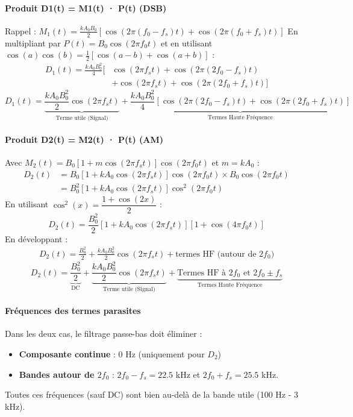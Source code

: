 \documentclass[11pt,a4paper]{article}
\begin{document}
\paragraph{Produit D1(t) = M1(t) · P(t) (DSB)}
Rappel : $M_1(t) = \frac{k A_0 B_0}{2}[\cos(2\pi(f_0-f_s)t) + \cos(2\pi(f_0+f_s)t)]$
En multipliant par $P(t) = B_0 \cos(2\pi f_0 t)$ et en utilisant $\cos(a)\cos(b) = \frac{1}{2}[\cos(a-b) + \cos(a+b)]$ :
\begin{align}
D_1(t) = \frac{k A_0 B_0^2}{4} [&\cos(2\pi f_s t) + \cos(2\pi(2f_0-f_s)t) \\
&+ \cos(2\pi f_s t) + \cos(2\pi(2f_0+f_s)t)]
\end{align}
\begin{equation}
\boxed{D_1(t) = \underbrace{\frac{k A_0 B_0^2}{2} \cos(2\pi f_s t)}_{\text{Terme utile (Signal)}} + \underbrace{\frac{k A_0 B_0^2}{4}[\cos(2\pi(2f_0-f_s)t) + \cos(2\pi(2f_0+f_s)t)]}_{\text{Termes Haute Fréquence}}}
\end{equation}

\paragraph{Produit D2(t) = M2(t) · P(t) (AM)}
Avec $M_2(t) = B_0[1 + m \cos(2\pi f_s t)] \cos(2\pi f_0 t)$ et $m=kA_0$ :
\begin{align}
D_2(t) &= B_0[1 + k A_0 \cos(2\pi f_s t)] \cos(2\pi f_0 t) \times B_0 \cos(2\pi f_0 t) \\
&= B_0^2[1 + k A_0 \cos(2\pi f_s t)] \cos^2(2\pi f_0 t)
\end{align}
En utilisant $\cos^2(x) = \dfrac{1 + \cos(2x)}{2}$ :
\begin{equation}
D_2(t) = \frac{B_0^2}{2}[1 + k A_0 \cos(2\pi f_s t)][1 + \cos(4\pi f_0 t)]
\end{equation}
En développant :
\begin{align}
D_2(t) = \frac{B_0^2}{2} + \frac{k A_0 B_0^2}{2}\cos(2\pi f_s t) + \text{termes HF (autour de } 2f_0\text{)}
\end{align}
\begin{equation}
\boxed{D_2(t) = \underbrace{\frac{B_0^2}{2}}_{\text{DC}} + \underbrace{\frac{k A_0 B_0^2}{2}\cos(2\pi f_s t)}_{\text{Terme utile (Signal)}} + \underbrace{\text{Termes HF à } 2f_0 \text{ et } 2f_0 \pm f_s}_{\text{Termes Haute Fréquence}}}
\end{equation}

\paragraph{Fréquences des termes parasites}
Dans les deux cas, le filtrage passe-bas doit éliminer :
\begin{itemize}
    \item \textbf{Composante continue} : 0 Hz (uniquement pour $D_2$)
    \item \textbf{Bandes autour de $2f_0$} : $2f_0 - f_s = 22.5$ kHz et $2f_0 + f_s = 25.5$ kHz.
\end{itemize}
Toutes ces fréquences (sauf DC) sont bien au-delà de la bande utile (100 Hz - 3 kHz).
\end{document}
